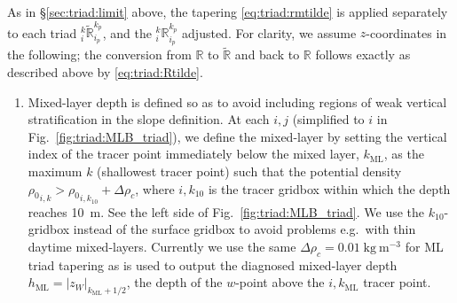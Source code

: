 \documentclass[NEMO_book]{subfiles}
\begin{document}
As in \S\ref{sec:triad:limit} above, the tapering
\eqref{eq:triad:rmtilde} is applied separately to each triad
$_i^k\tilde{\mathbb{R}}_{i_p}^{k_p}$, and the
$_i^k\mathbb{R}_{i_p}^{k_p}$ adjusted. For clarity, we assume
$z$-coordinates in the following; the conversion from
$\mathbb{R}$ to $\tilde{\mathbb{R}}$ and back to $\mathbb{R}$ follows exactly as described
above by \eqref{eq:triad:Rtilde}.
\begin{enumerate}
\item Mixed-layer depth is defined so as to avoid including regions of weak
vertical stratification in the slope definition.
 At each $i,j$ (simplified to $i$ in
Fig.~\ref{fig:triad:MLB_triad}), we define the mixed-layer by setting
the vertical index of the tracer point immediately below the mixed
layer, $k_\mathrm{ML}$, as the maximum $k$ (shallowest tracer point)
such that the potential density
${\rho_0}_{i,k}>{\rho_0}_{i,k_{10}}+\Delta\rho_c$, where $i,k_{10}$ is
the tracer gridbox within which the depth reaches 10~m. See the left
side of Fig.~\ref{fig:triad:MLB_triad}. We use the $k_{10}$-gridbox
instead of the surface gridbox to avoid problems e.g.\ with thin
daytime mixed-layers. Currently we use the same
$\Delta\rho_c=0.01\;\mathrm{kg\:m^{-3}}$ for ML triad tapering as is
used to output the diagnosed mixed-layer depth
$h_\mathrm{ML}=|z_{W}|_{k_\mathrm{ML}+1/2}$, the depth of the $w$-point
above the $i,k_\mathrm{ML}$ tracer point.


\end{enumerate}
\end{document}
